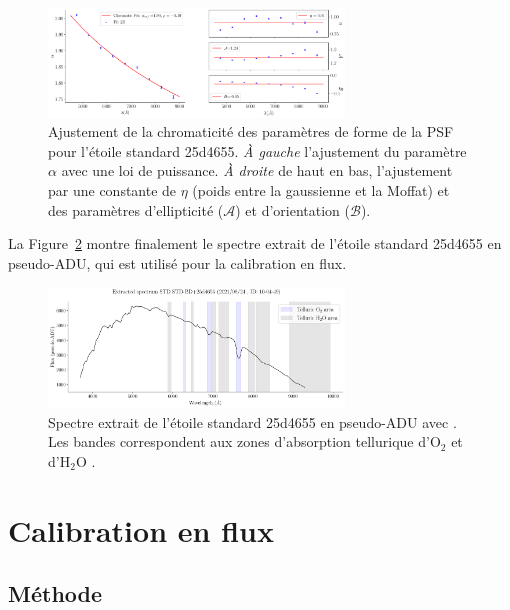 \documentclass[../main/main.tex]{subfiles}
\begin{document}
\begin{figure}
  \centering
  \includegraphics[width=0.7\textwidth]{../figures/06_irf/chromaticity_psf.pdf}
  \caption[Chromaticité des paramètres de forme de la PSF]{Ajustement de
    la chromaticité
    des paramètres de forme de la PSF pour l'étoile standard
    25d4655. \emph{À gauche} l'ajustement du paramètre $\alpha$ avec une
  loi de puissance. \emph{À droite} de haut en bas, l'ajustement par une
constante de $\eta$ (poids entre la gaussienne et la Moffat) et des
paramètres d'ellipticité ($\mathcal{A}$) et d'orientation ($\mathcal{B}$). }
  \label{fig:chromaticity_psf}
\end{figure}

La Figure~\ref{fig:stdspectrumadu} montre finalement le spectre extrait de
l'étoile standard 25d4655 en pseudo-ADU, qui est utilisé pour la calibration
en flux. 

\begin{figure}
  \centering
  \includegraphics[width=0.7\textwidth]{../figures/06_irf/stdspectra_adu.pdf}
  \caption[Spectre extrait de l'étoile standard 25d4655 en
  pseudo-ADU.]{Spectre extrait de l'étoile standard 25d4655 en
    pseudo-ADU avec \hypergal. Les bandes correspondent aux zones d'absorption
    tellurique d'O$_{2}$ et d'H$_{2}$O \citep{Buton2013}.}
  \label{fig:stdspectrumadu}
\end{figure}


\clearpage
\section{Calibration en flux}\label{sec:validationpsf}

\subsection{Méthode}\label{ssec:photocalibstd}
\end{document}
